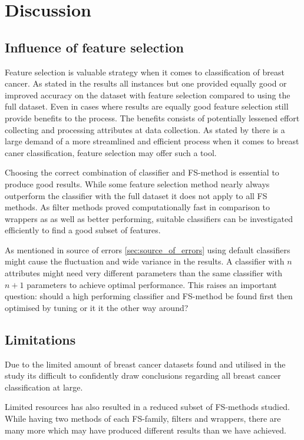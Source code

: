 \chapter{Discussion}

\section{Influence of feature selection}

Feature selection is valuable strategy when it comes to classification of breast cancer. As stated in the results all instances but one provided equally good or improved accuracy on the dataset with feature selection compared to using the full dataset. Even in cases where results are equally good feature selection still provide benefits to the process. The benefits consists of potentially lessened effort collecting and processing attributes at data collection. As stated by \textcite{martei2018} there is a large demand of a more streamlined and efficient process when it comes to breast caner classification, feature selection may offer such a tool.

Choosing the correct combination of classifier and FS-method is essential to produce good results. While some feature selection method nearly always outperform the classifier with the full dataset it does not apply to all FS methods. As filter methods proved computationally fast in comparison to wrappers as as well as better performing, suitable classifiers can be investigated efficiently to find a good subset of features.

As mentioned in source of errors \ref{sec:source_of_errors} using default classifiers might cause the fluctuation and wide variance in the results. A classifier with $n$ attributes might need very different parameters than the same classifier with $n + 1$ parameters to achieve optimal performance. This raises an important question: should a high performing classifier and FS-method be found first then optimised by tuning or it it the other way around?


\section{Limitations}

Due to the limited amount of breast cancer datasets found and utilised in the study its difficult to confidently draw conclusions regarding all breast cancer classification at large.

Limited resources has also resulted in a reduced subset of FS-methods studied. While having two methods of each FS-family, filters and wrappers, there are many more which may have produced different results than we have achieved.


